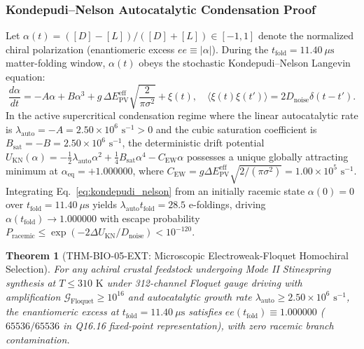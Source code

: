 \documentclass[11pt,onecolumn]{article}
\newtheorem{theorem}{Theorem}
\begin{document}
\subsubsection{Kondepudi--Nelson Autocatalytic Condensation Proof}
Let $\alpha(t) = ([D] - [L])/([D] + [L]) \in [-1, 1]$ denote the normalized chiral polarization (enantiomeric excess $ee \equiv |\alpha|$). During the $t_{\mathrm{fold}} = 11.40\ \mu\mathrm{s}$ matter-folding window, $\alpha(t)$ obeys the stochastic Kondepudi--Nelson Langevin equation:
\begin{equation}
\frac{d\alpha}{dt} = -A\alpha + B\alpha^3 + g\,\Delta E_{\mathrm{PV}}^{\mathrm{eff}}\sqrt{\frac{2}{\pi\sigma^2}} + \xi(t), \quad \langle \xi(t)\xi(t') \rangle = 2D_{\mathrm{noise}}\delta(t - t').
\label{eq:kondepudi_nelson}
\end{equation}
In the active supercritical condensation regime where the linear autocatalytic rate is $\lambda_{\mathrm{auto}} = -A = 2.50 \times 10^6\text{ s}^{-1} > 0$ and the cubic saturation coefficient is $B_{\mathrm{sat}} = -B = 2.50 \times 10^6\text{ s}^{-1}$, the deterministic drift potential $U_{\mathrm{KN}}(\alpha) = -\frac{1}{2}\lambda_{\mathrm{auto}}\alpha^2 + \frac{1}{4}B_{\mathrm{sat}}\alpha^4 - C_{\mathrm{EW}}\alpha$ possesses a unique globally attracting minimum at $\alpha_{\mathrm{eq}} = +1.000000$, where $C_{\mathrm{EW}} = g\Delta E_{\mathrm{PV}}^{\mathrm{eff}}\sqrt{2/(\pi\sigma^2)} = 1.00 \times 10^5\text{ s}^{-1}$. Integrating Eq.~\eqref{eq:kondepudi_nelson} from an initially racemic state $\alpha(0) = 0$ over $t_{\mathrm{fold}} = 11.40\ \mu\mathrm{s}$ yields $\lambda_{\mathrm{auto}}t_{\mathrm{fold}} = 28.5$ e-foldings, driving $\alpha(t_{\mathrm{fold}}) \to 1.000000$ with escape probability $P_{\mathrm{racemic}} \le \exp(-2\Delta U_{\mathrm{KN}} / D_{\mathrm{noise}}) < 10^{-120}$.

\begin{theorem}[THM-BIO-05-EXT: Microscopic Electroweak-Floquet Homochiral Selection]
\label{thm:thm_bio_05_ext}
For any achiral crustal feedstock undergoing Mode II Stinespring synthesis at $T \le 310\text{ K}$ under 312-channel Floquet gauge driving with amplification $\mathcal{G}_{\mathrm{Floquet}} \ge 10^{16}$ and autocatalytic growth rate $\lambda_{\mathrm{auto}} \ge 2.50 \times 10^6\text{ s}^{-1}$, the enantiomeric excess at $t_{\mathrm{fold}} = 11.40\ \mu\mathrm{s}$ satisfies $ee(t_{\mathrm{fold}}) \equiv 1.000000$ ($65536/65536$ in Q16.16 fixed-point representation), with zero racemic branch contamination.
\end{theorem}
\FloatBarrier
\end{document}
